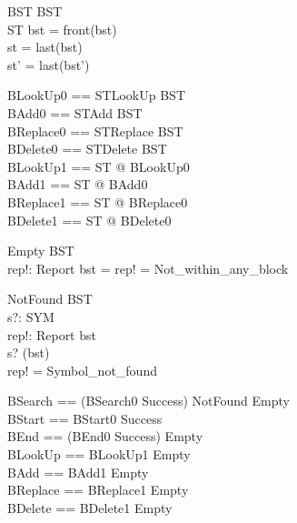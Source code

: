 \begin{schema}{\Phi BST}
  \Delta BST \\
  \Delta ST
\where
  bst \neq \langle\rangle = front(bst) \\
  st = last(bst) \\
  st' = last(bst')
\end{schema}

\begin{zed}
  BLookUp0 == STLookUp \land \Phi BST \\
  BAdd0 == STAdd \land \Phi BST \\
  BReplace0 == STReplace \land \Phi BST \\
  BDelete0 == STDelete \land \Phi BST \\

  BLookUp1 == \exists \Delta ST @ BLookUp0 \\
  BAdd1 == \exists \Delta ST @ BAdd0 \\
  BReplace1 == \exists \Delta ST @ BReplace0 \\
  BDelete1 == \exists \Delta ST @ BDelete0
\end{zed}

\begin{schema}{Empty}
  \Xi BST \\
  rep!: Report
\where
  bst = \langle\rangle \land rep! = Not\_within\_any\_block
\end{schema}

\begin{schema}{NotFound}
  \Xi BST \\
  s?: SYM \\
  rep!: Report
\where
  bst \neq \langle\rangle \\
  s? \notin \dom(\distro bst) \\
  rep! = Symbol\_not\_found
\end{schema}

\begin{zed}
  BSearch == (BSearch0 \land Success) \lor NotFound \lor Empty \\
  BStart == BStart0 \land Success \\
  BEnd == (BEnd0 \land Success) \lor Empty \\
  BLookUp == BLookUp1 \lor Empty \\
  BAdd == BAdd1 \lor Empty \\
  BReplace == BReplace1 \lor Empty \\
  BDelete == BDelete1 \lor Empty
\end{zed}